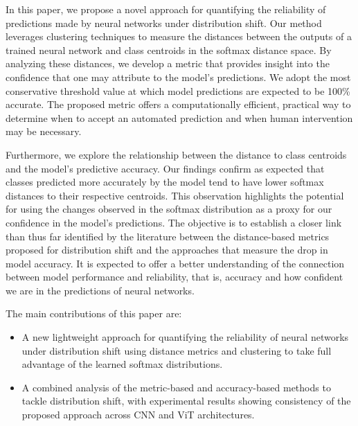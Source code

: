 In this paper, we propose a novel approach for quantifying the reliability of predictions made by neural networks under distribution shift. Our method leverages clustering techniques to measure the distances between the outputs of a trained neural network and class centroids in the softmax distance space. By analyzing these distances, we develop a metric that provides insight into the confidence that one may attribute to the model's predictions. We adopt the most conservative threshold value at which model predictions are expected to be 100\% accurate. The proposed metric offers a computationally efficient, practical way to determine when to accept an automated prediction and when human intervention may be necessary.

Furthermore, we explore the relationship between the distance to class centroids and the model's predictive accuracy. Our findings confirm as expected that classes predicted more accurately by the model tend to have lower softmax distances to their respective centroids. This observation highlights the potential for using the changes observed in the softmax distribution as a proxy for our confidence in the model's predictions. The objective is to establish a closer link than thus far identified by the literature between the distance-based metrics proposed for distribution shift and the approaches that measure the drop in model accuracy. It is expected to offer a better understanding of the connection between model performance and reliability, that is, accuracy and how confident we are in the predictions of neural networks. 



The main contributions of this paper are:
\begin{itemize}
\item A new lightweight approach for quantifying the reliability of neural networks under distribution shift using distance metrics and clustering to take full advantage of the learned softmax distributions.
\item A combined analysis of the metric-based and accuracy-based methods to tackle distribution shift, with experimental results showing consistency of the proposed approach across CNN and ViT architectures.
\end{itemize}

